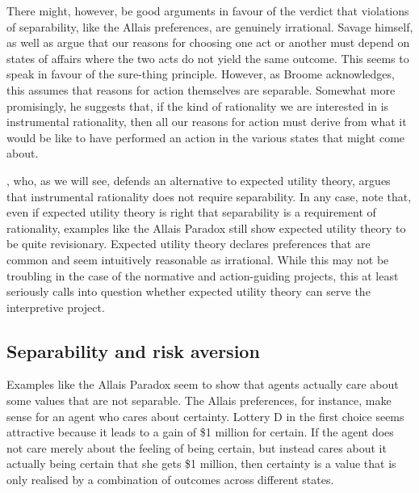 There might, however, be good arguments in favour of the verdict that violations of separability, like the Allais preferences, are genuinely irrational. Savage himself, as well as \citet{Broome1991} argue that our reasons for choosing one act or another must depend on states of affairs where the two acts do not yield the same outcome. This seems to speak in favour of the sure-thing principle. However, as Broome acknowledges, this assumes that reasons for action themselves are separable. Somewhat more promisingly, he suggests that, if the kind of rationality we are interested in is instrumental rationality, then all our reasons for action must derive from what it would be like to have performed an action in the various states that might come about.

\citet{Buchak2013}, who, as we will see, defends an alternative to expected utility theory, argues that instrumental rationality does not require separability. In any case, note that, even if expected utility theory is right that separability is a requirement of rationality, examples like the Allais Paradox still show expected utility theory to be quite revisionary. Expected utility theory declares preferences that are common and seem intuitively reasonable as irrational. While this may not be troubling in the case of the normative and action-guiding projects, this at least seriously calls into question whether expected utility theory can serve the interpretive project.

\subsection{Separability and risk aversion}\label{subs53}

Examples like the Allais Paradox seem to show that agents actually care about some values that are not separable. The Allais preferences, for instance, make sense for an agent who cares about certainty. Lottery D in the first choice seems attractive because it leads to a gain of \$1 million for certain. If the agent does not care merely about the feeling of being certain, but instead cares about it actually being certain that she gets \$1 million, then certainty is a value that is only realised by a combination of outcomes across different states.

